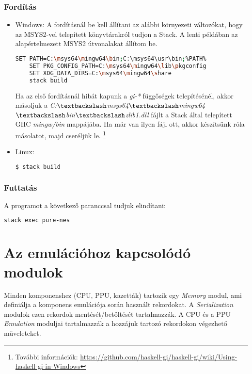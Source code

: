 \subsubsection{Fordítás}
\begin{itemize}
	\item Windows: A fordításnál be kell állítani az alábbi környezeti változókat, hogy 
	az MSYS2-vel telepített könyvtárakról tudjon a Stack. A lenti példában az alapértelmezett MSYS2 útvonalakat állítom be.
	\begin{lstlisting}[language=bash]
	SET PATH=C:\msys64\mingw64\bin;C:\msys64\usr\bin;%PATH%
	SET PKG_CONFIG_PATH=C:\msys64\mingw64\lib\pkgconfig
	SET XDG_DATA_DIRS=C:\msys64\mingw64\share
	stack build
	\end{lstlisting}
	Ha az első fordításnál hibát kapunk a \emph{gi-*} függőségek telepítésénél, akkor másoljuk a 
	\emph{C:$\textbackslash$msys64$\textbackslash$mingw64$\textbackslash$bin$\textbackslash$zlib1.dll} fájlt a Stack által telepített GHC \emph{mingw/bin} mappájába. Ha már van ilyen fájl ott, akkor készítsünk róla másolatot, majd cseréljük le.
	\footnote{További információk: \url{https://github.com/haskell-gi/haskell-gi/wiki/Using-haskell-gi-in-Windows}}

	\item Linux:
	\begin{lstlisting}[language=bash]
	$ stack build
	\end{lstlisting}
\end{itemize}

\subsubsection{Futtatás}
A programot a következő paranccsal tudjuk elindítani:
\begin{lstlisting}[language=bash]
stack exec pure-nes
\end{lstlisting}

\section{Az emulációhoz kapcsolódó modulok}

Minden komponenshez (CPU, PPU, kazetták) tartozik egy \emph{Memory} modul, ami definiálja a komponens emulációja során használt rekordokat. A \emph{Serialization} modulok ezen rekordok mentését/betöltését tartalmazzák. A CPU és a PPU \emph{Emulation} moduljai tartalmazzák a hozzájuk tartozó rekordokon végezhető műveleteket.

